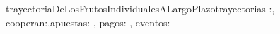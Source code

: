 \begin{proc}{trayectoriaDeLosFrutosIndividualesALargoPlazo}{\Inout trayectorias :\TLista{\TLista{\float}}, \In cooperan:\TLista{\Bool},\In apuestas: \TLista{\TLista{\float}}, \In pagos: \TLista{\TLista{\float}}, \In eventos: \TLista{\TLista{\nat}}}


\end{proc}

